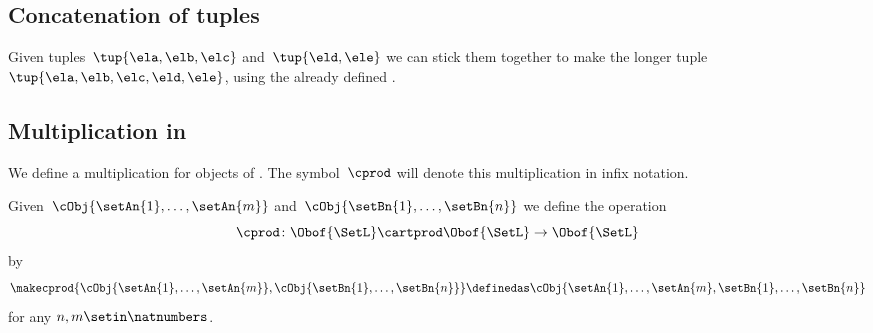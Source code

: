 \subsection{Concatenation of tuples}

Given tuples~$\tup{\ela, \elb, \elc}$ and~$\tup{\eld, \ele}$ we can stick them together to make the longer tuple~$\tup{\ela, \elb, \elc, \eld, \ele}$, using the already defined .


\subsection{Multiplication in \SetL}
\label{sec:multiplication-for-SetL}
We define a multiplication for objects of \SetL.
The symbol~$\cprod$ will denote this multiplication in infix notation.

Given~$\cObj{\setAn{1}, \ldots, \setAn{m}}$ and~$\cObj{\setBn{1}, \ldots, \setBn{n}}$ we define the operation
\begin{equation}
    \label{eq:mult-setl-sign}
    \cprod \colon \Obof{\SetL} \cartprod \Obof{\SetL} \to \Obof{\SetL}
\end{equation}
by
\begin{equation}
    \label{eq:strict-monoidal-product-sets}
    \makecprod{
        \cObj{\setAn{1}, \ldots, \setAn{m}},
        \cObj{\setBn{1}, \ldots, \setBn{n}}
    } \definedas \cObj{\setAn{1}, \ldots, \setAn{m}, \setBn{1},  \ldots, \setBn{n}}
\end{equation}
for any $n, m \setin \natnumbers$.


